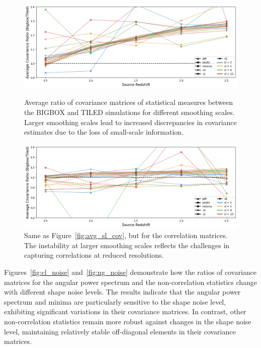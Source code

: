 \begin{figure}[p]
    \centering
    \includegraphics[width=\textwidth]{figures/results/avg_cov_ratio_sl.png}
    \caption[Average BIGBOX/TILED Ratio of Covariance for multiple smoothing scales]{Average ratio of covariance matrices of statistical measures between the BIGBOX and TILED simulations for different smoothing scales. Larger smoothing scales lead to increased discrepancies in covariance estimates due to the loss of small-scale information.}
    \label{fig:avg_sl_cov}
    \vspace{2cm}
    \includegraphics[width=\textwidth]{figures/results/avg_corr_ratio_sl.png}
    \caption[Average BIGBOX/TILED Ratio of Correlation for multiple smoothing scales]{Same as Figure~\ref{fig:avg_sl_cov}, but for the correlation matrices. The instability at larger smoothing scales reflects the challenges in capturing correlations at reduced resolutions.}
    \label{fig:avg_sl_corr}
\end{figure}

Figures~\ref{fig:cl_noise} and~\ref{fig:ng_noise} demonstrate how the ratios of covariance matrices for the angular power spectrum and the non-correlation statistics change with different shape noise levels. The results indicate that the angular power spectrum and minima are particularly sensitive to the shape noise level, exhibiting significant variations in their covariance matrices. In contrast, other non-correlation statistics remain more robust against changes in the shape noise level, maintaining relatively stable off-diagonal elements in their covariance matrices.

